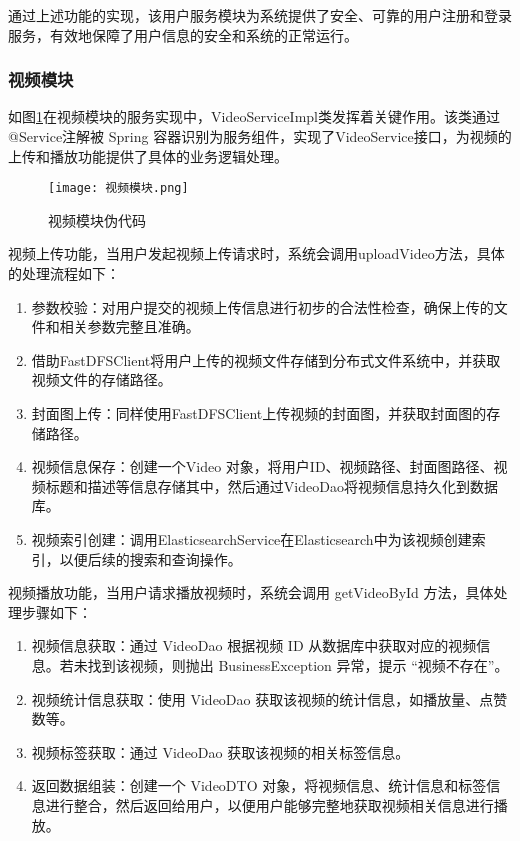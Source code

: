 通过上述功能的实现，该用户服务模块为系统提供了安全、可靠的用户注册和登录服务，有效地保障了用户信息的安全和系统的正常运行。

\subsubsection{视频模块}

如图\ref{视频模块伪代码}在视频模块的服务实现中，VideoServiceImpl类发挥着关键作用。该类通过@Service注解被 Spring 容器识别为服务组件，实现了VideoService接口，为视频的上传和播放功能提供了具体的业务逻辑处理。
\begin{figure}[hbt]
    \centering
    \texttt{[image: 视频模块.png]}
    \caption{视频模块伪代码}
    \label{视频模块伪代码}
\end{figure}

视频上传功能，当用户发起视频上传请求时，系统会调用uploadVideo方法，具体的处理流程如下：
\begin{enumerate}[label=(\arabic*)]
    \item 参数校验：对用户提交的视频上传信息进行初步的合法性检查，确保上传的文件和相关参数完整且准确。
    \item 借助FastDFSClient将用户上传的视频文件存储到分布式文件系统中，并获取视频文件的存储路径。
    \item 封面图上传：同样使用FastDFSClient上传视频的封面图，并获取封面图的存储路径。
    \item 视频信息保存：创建一个Video 对象，将用户ID、视频路径、封面图路径、视频标题和描述等信息存储其中，然后通过VideoDao将视频信息持久化到数据库。
    \item 视频索引创建：调用ElasticsearchService在Elasticsearch中为该视频创建索引，以便后续的搜索和查询操作。
\end{enumerate}

视频播放功能，当用户请求播放视频时，系统会调用 getVideoById 方法，具体处理步骤如下：
\begin{enumerate}[label=(\arabic*)]
    \item 视频信息获取：通过 VideoDao 根据视频 ID 从数据库中获取对应的视频信息。若未找到该视频，则抛出 BusinessException 异常，提示 “视频不存在”。
    \item 视频统计信息获取：使用 VideoDao 获取该视频的统计信息，如播放量、点赞数等。
    \item 视频标签获取：通过 VideoDao 获取该视频的相关标签信息。
    \item 返回数据组装：创建一个 VideoDTO 对象，将视频信息、统计信息和标签信息进行整合，然后返回给用户，以便用户能够完整地获取视频相关信息进行播放。
\end{enumerate}

